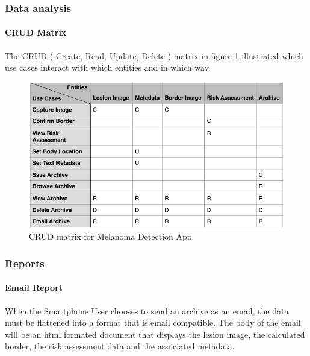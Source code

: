         \subsubsection{Data analysis}
            \paragraph{CRUD Matrix}

                The CRUD ( Create, Read, Update, Delete ) matrix in figure \ref{fig:crud} illustrated which use cases interact with which entities and in which way.

                \begin{figure}[H]
                    \centering
                    \includegraphics[width=\textwidth]{assets/requirements/CRUD.pdf}
                    \caption{CRUD matrix for Melanoma Detection App}
                    \label{fig:crud}
                \end{figure}

        \subsubsection{Reports}
            \paragraph{Email Report}
                When the Smartphone User chooses to send an archive as an email, the data must be flattened into a format that is email compatible. The body of the email will be an html formated document that displays the lesion image, the calculated border, the risk assessment data and the associated metadata.



